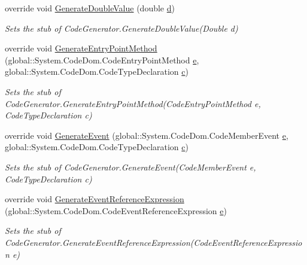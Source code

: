 \begin{DoxyCompactItemize}
override void \hyperlink{class_system_1_1_code_dom_1_1_compiler_1_1_fakes_1_1_stub_code_generator_abb46109bdf5d560b297d8fce867377ca}{Generate\-Double\-Value} (double \hyperlink{bootstrap_8min_8js_aeb337d295abaddb5ec3cb34cc2e2bbc9}{d})
\begin{DoxyCompactList}\small\item\em Sets the stub of Code\-Generator.\-Generate\-Double\-Value(\-Double d)\end{DoxyCompactList}\item 
override void \hyperlink{class_system_1_1_code_dom_1_1_compiler_1_1_fakes_1_1_stub_code_generator_a3ca97340493e7f71107a2df0260f2357}{Generate\-Entry\-Point\-Method} (global\-::\-System.\-Code\-Dom.\-Code\-Entry\-Point\-Method \hyperlink{jquery-1_810_82_8min_8js_a2c038346d47955cbe2cb91e338edd7e1}{e}, global\-::\-System.\-Code\-Dom.\-Code\-Type\-Declaration \hyperlink{bootstrap_8min_8js_abce695e0af988ece0826d9ad59b8160d}{c})
\begin{DoxyCompactList}\small\item\em Sets the stub of Code\-Generator.\-Generate\-Entry\-Point\-Method(\-Code\-Entry\-Point\-Method e, Code\-Type\-Declaration c)\end{DoxyCompactList}\item 
override void \hyperlink{class_system_1_1_code_dom_1_1_compiler_1_1_fakes_1_1_stub_code_generator_a338f38da7f4cd3ab3e0ecf5aec9716e4}{Generate\-Event} (global\-::\-System.\-Code\-Dom.\-Code\-Member\-Event \hyperlink{jquery-1_810_82_8min_8js_a2c038346d47955cbe2cb91e338edd7e1}{e}, global\-::\-System.\-Code\-Dom.\-Code\-Type\-Declaration \hyperlink{bootstrap_8min_8js_abce695e0af988ece0826d9ad59b8160d}{c})
\begin{DoxyCompactList}\small\item\em Sets the stub of Code\-Generator.\-Generate\-Event(\-Code\-Member\-Event e, Code\-Type\-Declaration c)\end{DoxyCompactList}\item 
override void \hyperlink{class_system_1_1_code_dom_1_1_compiler_1_1_fakes_1_1_stub_code_generator_a310aa653656fb9aa1cdf8a488073d96e}{Generate\-Event\-Reference\-Expression} (global\-::\-System.\-Code\-Dom.\-Code\-Event\-Reference\-Expression \hyperlink{jquery-1_810_82_8min_8js_a2c038346d47955cbe2cb91e338edd7e1}{e})
\begin{DoxyCompactList}\small\item\em Sets the stub of Code\-Generator.\-Generate\-Event\-Reference\-Expression(\-Code\-Event\-Reference\-Expression e)\end{DoxyCompactList}\item 

\end{DoxyCompactItemize}
